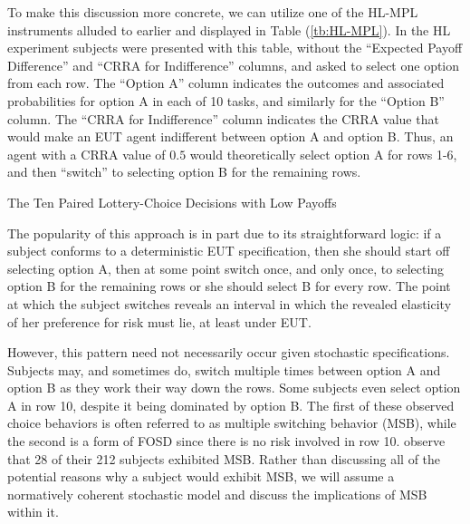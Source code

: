 \documentclass[../main.tex]{subfiles}
\begin{document}
To make this discussion more concrete, we can utilize one of the HL-MPL instruments alluded to earlier and displayed in Table (\ref{tb:HL-MPL}).
In the HL experiment subjects were presented with this table, without the \enquote{Expected Payoff Difference} and \enquote{CRRA for Indifference} columns, and asked to select one option from each row.
The \enquote{Option A} column indicates the outcomes and associated probabilities for option A in each of 10 tasks, and similarly for the \enquote{Option B} column.
The \enquote{CRRA for Indifference} column indicates the CRRA value that would make an EUT agent indifferent between option A and option B.
Thus, an agent with a CRRA value of $0.5$ would theoretically select option A for rows 1-6, and then \enquote{switch} to selecting option B for the remaining rows.

\begin{table}[ht]
	\centering
	\captionsetup{justification=centering}
	\caption{The Ten Paired Lottery-Choice Decisions with Low Payoffs \newline \textcite[1645]{Holt2002} }
	\label{tb:HL-MPL}
	\begin{adjustbox}{width=1\textwidth}
	\end{adjustbox}
\end{table}

The popularity of this approach is in part due to its straightforward logic:
if a subject conforms to a deterministic EUT specification, then she should start off selecting option A, then at some point switch once, and only once, to selecting option B for the remaining rows or she should select B for every row.
The point at which the subject switches reveals an interval in which the revealed elasticity of her preference for risk must lie, at least under EUT.

However, this pattern need not necessarily occur given stochastic specifications.
Subjects may, and sometimes do, switch multiple times between option A and option B as they work their way down the rows.
Some subjects even select option A in row 10, despite it being dominated by option B.
The first of these observed choice behaviors is often referred to as multiple switching behavior (MSB), while the second is a form of FOSD since there is no risk involved in row 10.
\textcite[1647]{Holt2002} observe that 28 of their 212 subjects exhibited MSB.
Rather than discussing all of the potential reasons why a subject would exhibit MSB, we will assume a normatively coherent stochastic model and discuss the implications of MSB within it.
\end{document}
